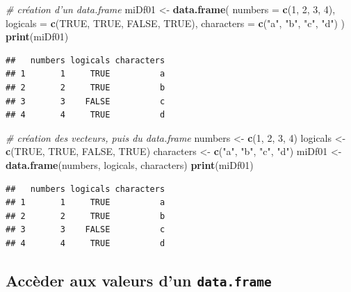 \documentclass[]{book}
\newenvironment{Shaded}{\begin{snugshade}}{\end{snugshade}}
\newcommand{\KeywordTok}[1]{\textcolor[rgb]{0.13,0.29,0.53}{\textbf{#1}}}
\newcommand{\DataTypeTok}[1]{\textcolor[rgb]{0.13,0.29,0.53}{#1}}
\newcommand{\DecValTok}[1]{\textcolor[rgb]{0.00,0.00,0.81}{#1}}
\newcommand{\StringTok}[1]{\textcolor[rgb]{0.31,0.60,0.02}{#1}}
\newcommand{\CommentTok}[1]{\textcolor[rgb]{0.56,0.35,0.01}{\textit{#1}}}
\newcommand{\OtherTok}[1]{\textcolor[rgb]{0.56,0.35,0.01}{#1}}
\newcommand{\NormalTok}[1]{#1}
\begin{document}
\begin{Shaded}
\begin{Highlighting}[]
\CommentTok{# création d'un data.frame }
\NormalTok{miDf01 <-}\StringTok{ }\KeywordTok{data.frame}\NormalTok{(}
  \DataTypeTok{numbers =} \KeywordTok{c}\NormalTok{(}\DecValTok{1}\NormalTok{, }\DecValTok{2}\NormalTok{, }\DecValTok{3}\NormalTok{, }\DecValTok{4}\NormalTok{), }
  \DataTypeTok{logicals =} \KeywordTok{c}\NormalTok{(}\OtherTok{TRUE}\NormalTok{, }\OtherTok{TRUE}\NormalTok{, }\OtherTok{FALSE}\NormalTok{, }\OtherTok{TRUE}\NormalTok{), }
  \DataTypeTok{characters =} \KeywordTok{c}\NormalTok{(}\StringTok{"a"}\NormalTok{, }\StringTok{"b"}\NormalTok{, }\StringTok{"c"}\NormalTok{, }\StringTok{"d"}\NormalTok{)}
\NormalTok{)}
\KeywordTok{print}\NormalTok{(miDf01)}
\end{Highlighting}
\end{Shaded}

\begin{verbatim}
##   numbers logicals characters
## 1       1     TRUE          a
## 2       2     TRUE          b
## 3       3    FALSE          c
## 4       4     TRUE          d
\end{verbatim}

\begin{Shaded}
\begin{Highlighting}[]
\CommentTok{# création des vecteurs, puis du data.frame}
\NormalTok{numbers <-}\StringTok{ }\KeywordTok{c}\NormalTok{(}\DecValTok{1}\NormalTok{, }\DecValTok{2}\NormalTok{, }\DecValTok{3}\NormalTok{, }\DecValTok{4}\NormalTok{)}
\NormalTok{logicals <-}\StringTok{ }\KeywordTok{c}\NormalTok{(}\OtherTok{TRUE}\NormalTok{, }\OtherTok{TRUE}\NormalTok{, }\OtherTok{FALSE}\NormalTok{, }\OtherTok{TRUE}\NormalTok{)}
\NormalTok{characters <-}\StringTok{ }\KeywordTok{c}\NormalTok{(}\StringTok{"a"}\NormalTok{, }\StringTok{"b"}\NormalTok{, }\StringTok{"c"}\NormalTok{, }\StringTok{"d"}\NormalTok{)}
\NormalTok{miDf01 <-}\StringTok{ }\KeywordTok{data.frame}\NormalTok{(numbers, logicals, characters)}
\KeywordTok{print}\NormalTok{(miDf01)}
\end{Highlighting}
\end{Shaded}

\begin{verbatim}
##   numbers logicals characters
## 1       1     TRUE          a
## 2       2     TRUE          b
## 3       3    FALSE          c
## 4       4     TRUE          d
\end{verbatim}

\subsection{\texorpdfstring{Accèder aux valeurs d'un
\texttt{data.frame}}{Accèder aux valeurs d'un data.frame}}\label{acceder-aux-valeurs-dun-data.frame}
\end{document}
